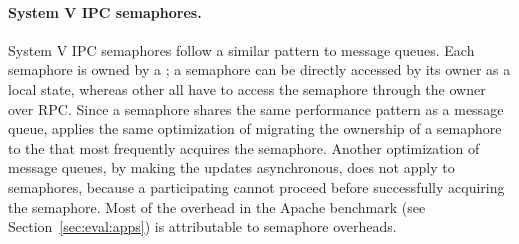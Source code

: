 
\paragraph{System V IPC semaphores.} System V IPC semaphores 
follow a similar pattern to message queues.
Each semaphore is owned by a \picoproc{};
a semaphore can be directly accessed by its owner as a local state,
whereas other \picoprocs{} all have to access the semaphore through the owner over RPC.
Since a semaphore shares the same performance pattern as a message queue,
\thelibos{} applies the same optimization
of migrating the ownership of a semaphore
to the \picoproc{} that most frequently acquires the semaphore.
Another optimization of message queues, by making the updates asynchronous,
does not apply to semaphores,
because a participating \picoproc{} cannot proceed before successfully acquiring the semaphore. 
Most of the overhead in the Apache benchmark (see Section~\ref{sec:eval:apps}) is attributable to semaphore overheads.

